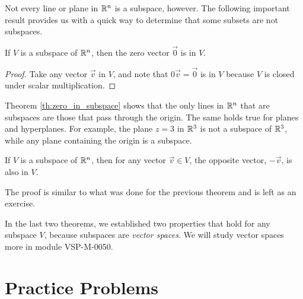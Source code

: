 \documentclass{ximera}
\begin{document}
Not every line or plane in $\mathbb{R}^n$ is a subspace, however.  The following important result provides us with a quick way to determine that some subsets are not subspaces.

\begin{theorem} \label{th:zero_in_subspace}
If $V$ is a subspace of $\mathbb{R}^n$, then the zero vector $\vec{0}$ is in $V$.
\end{theorem}

\begin{proof} 
Take any vector $\vec{v}$ in $V$, and note that $0 \vec{v} = \vec{0}$ is in $V$ because $V$ is closed under scalar multiplication.
\end{proof}



Theorem \ref{th:zero_in_subspace} shows that the only lines in $\mathbb{R}^n$ that are subspaces are those that pass through the origin.  The same holds true for planes and hyperplanes.  For example, the plane $z=3$ in $\mathbb{R}^3$ is not a subspace of $\mathbb{R}^3$, while any plane containing the origin is a subspace.

\begin{theorem} \label{opposite_in_subspace}
If $V$ is a subspace of $\mathbb{R}^n$, then for any vector $\vec{v} \in V$, the opposite vector, $-\vec{v}$, is also in $V$.
\end{theorem}

The proof is similar to what was done for the previous theorem and is left as an exercise.

In the last two theorems, we established two properties that hold for any subspace $V$, because subspaces are \emph{vector spaces}.  We will study vector spaces more in module VSP-M-0050.



\section*{Practice Problems}
\end{document}
